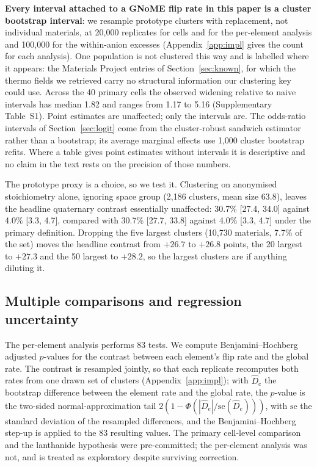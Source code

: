 \documentclass[11pt]{article}
\begin{document}
\textbf{Every interval attached to a GNoME flip rate in this paper is a cluster bootstrap
interval}: we resample prototype clusters with replacement, not individual materials, at
20{,}000 replicates for cells and for the per-element analysis and 100{,}000 for the
within-anion excesses (Appendix~\ref{app:impl} gives the count for each analysis). One
population is not clustered this way and is labelled where it appears: the Materials
Project entries of Section~\ref{sec:known}, for which the thermo fields we retrieved carry
no structural information our clustering key could use. Across the 40 primary cells the
observed widening relative to naive intervals has median 1.82 and ranges from 1.17 to
5.16 (Supplementary Table~S1). Point estimates are unaffected; only the intervals are. The odds-ratio intervals of
Section~\ref{sec:logit} come from the cluster-robust sandwich estimator rather than a
bootstrap; its average marginal effects use 1{,}000 cluster bootstrap refits. Where a table gives point estimates without intervals it is descriptive and no
claim in the text rests on the precision of those numbers.

The prototype proxy is a choice, so we test it. Clustering on anonymised stoichiometry
alone, ignoring space group (2{,}186 clusters, mean size 63.8), leaves the headline
quaternary contrast essentially unaffected: 30.7\% [27.4, 34.0] against 4.0\%
[3.3, 4.7], compared with 30.7\% [27.7, 33.8] against 4.0\% [3.3, 4.7] under the
primary definition. Dropping the five largest clusters (10{,}730 materials, 7.7\% of the
set) moves the headline contrast from $+26.7$ to $+26.8$ points, the 20 largest to
$+27.3$ and the 50 largest to $+28.2$, so the largest clusters are if anything diluting
it.

\subsection{Multiple comparisons and regression uncertainty}

The per-element analysis performs 83 tests. We compute Benjamini--Hochberg adjusted
$p$-values for the contrast between each element's flip rate and the global rate. The
contrast is resampled jointly, so that each replicate recomputes both rates from one
drawn set of clusters (Appendix~\ref{app:impl}); with $\hat D_e$ the bootstrap
difference between the element rate and the global rate, the $p$-value is the two-sided
normal-approximation tail $2\left(1-\Phi\!\left(|\hat D_e| / \mathrm{se}(\hat
D_e)\right)\right)$, with $\mathrm{se}$ the standard deviation of the resampled
differences, and the Benjamini--Hochberg step-up is applied to the 83 resulting values.
The primary cell-level comparison and the lanthanide hypothesis were pre-committed; the
per-element analysis was not, and is treated as exploratory despite surviving
correction.
\end{document}
